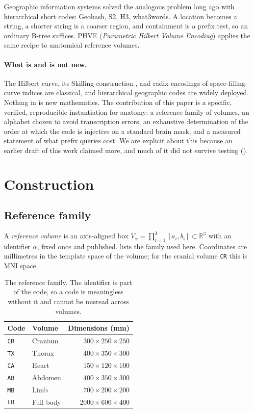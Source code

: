 \documentclass[11pt,a4paper]{article}
\theoremstyle{plain}
\theoremstyle{definition}
\theoremstyle{remark}
\newcommand{\R}{\mathbb{R}}
\begin{document}
Geographic information systems solved the analogous problem long ago with
hierarchical short codes: Geohash, S2, H3, what3words. A location becomes a
string, a shorter string is a coarser region, and containment is a prefix
test, so an ordinary B-tree suffices. PHVE (\emph{Parametric Hilbert Volume
Encoding}) applies the same recipe to anatomical reference volumes.

\paragraph{What is and is not new.} The Hilbert curve, its Skilling
construction \cite{skilling}, and radix encodings of space-filling-curve
indices are classical, and hierarchical geographic codes are widely
deployed. Nothing in  is new mathematics. The
contribution of this paper is a specific, verified, reproducible
instantiation for anatomy: a reference family of volumes, an alphabet
chosen to avoid transcription errors, an exhaustive determination of the
order at which the code is injective on a standard brain mask, and a
measured statement of what prefix queries cost. We are explicit about this
because an earlier draft of this work claimed more, and much of it did not
survive testing ().

\section{Construction}\label{sec:construction}

\subsection{Reference family}

A \emph{reference volume} is an axis-aligned box
$V_\alpha=\prod_{i=1}^{3}[a_i,b_i]\subset\R^3$ with an identifier
$\alpha$, fixed once and published.  lists the family used
here. Coordinates are millimetres in the template space of the volume; for
the cranial volume \texttt{CR} this is MNI space.

\begin{table}[h]
\centering
\begin{tabular}{llr}
\toprule
Code & Volume & Dimensions (mm)\\
\midrule
\texttt{CR} & Cranium    & $300\times250\times250$\\
\texttt{TX} & Thorax     & $400\times350\times300$\\
\texttt{CA} & Heart      & $150\times120\times100$\\
\texttt{AB} & Abdomen    & $400\times350\times300$\\
\texttt{MB} & Limb       & $700\times200\times200$\\
\texttt{FB} & Full body  & $2000\times600\times400$\\
\bottomrule
\end{tabular}
\caption{The reference family. The identifier is part of the code, so a
code is meaningless without it and cannot be misread across volumes.}
\label{tab:volumes}
\end{table}
\end{document}
